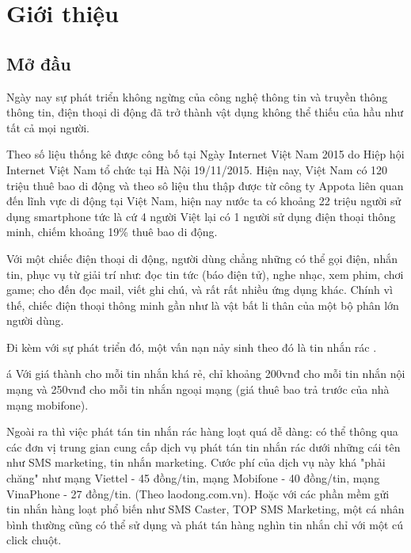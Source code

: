 \chapter{Giới thiệu}
\section{Mở đầu}
Ngày nay sự phát triển không ngừng của công nghệ thông tin và truyền thông thông tin, điện thoại di động đã trở thành vật dụng không thể thiếu của hầu như tất cả mọi người.

Theo số liệu thống kê được công bố tại Ngày Internet Việt Nam 2015 do Hiệp hội Internet Việt Nam tổ chức tại Hà Nội 19/11/2015. Hiện nay, Việt Nam có 120 triệu thuê bao di động và theo sô liệu thu thập được từ công ty Appota liên quan đến lĩnh vực di động tại Việt Nam, hiện nay nước ta có khoảng 22 triệu người sử dụng smartphone tức là cứ 4 người Việt lại có 1 người sử dụng điện thoại thông minh, chiếm khoảng 19\% thuê bao di động.

Với một chiếc điện thoại di động, người dùng chẳng những có thể gọi điện, nhắn tin, phục vụ từ giải trí như: đọc tin tức (báo điện tử), nghe nhạc, xem phim, chơi game; cho đến đọc mail, viết ghi chú, và rất rất nhiều ứng dụng khác. Chính vì thế, chiếc điện thoại thông minh gần như là vật bất li thân của một bộ phân lớn người dùng.
 
Đi kèm với sự phát triển đó, một vấn nạn nảy sinh theo đó là tin nhắn rác \cite{ma2016}.

á
Với giá thành cho mỗi tin nhắn khá rẻ, chỉ khoảng 200vnđ cho mỗi tin nhắn nội mạng và 250vnđ cho mỗi tin nhắn ngoại mạng (giá thuê bao trả trước của nhà mạng mobifone).

Ngoài ra thì việc phát tán tin nhắn rác hàng loạt quá dễ dàng: có thể thông qua các đơn vị trung gian cung cấp dịch vụ phát tán tin nhắn rác dưới những cái tên như SMS marketing, tin nhắn marketing. Cước phí của dịch vụ này khá "phải chăng" như mạng Viettel - 45 đồng/tin, mạng Mobifone  - 40 đồng/tin, mạng VinaPhone - 27 đồng/tin. (Theo laodong.com.vn). Hoặc với các phần mềm gửi tin nhắn hàng loạt phổ biến như SMS Caster, TOP SMS Marketing, một cá nhân bình thường cũng có thể sử dụng và phát tán hàng nghìn tin nhắn chỉ với một cú click chuột.

